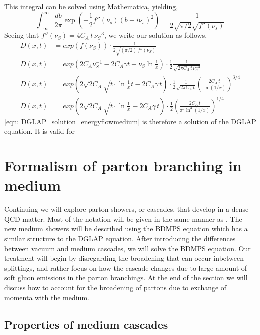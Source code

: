 \documentclass[main.tex]{subfiles}
\begin{document}
This integral can be solved using Mathematica, yielding,
\begin{equation}
    \int_{-\infty}^{\infty}\frac{db}{2\pi} \exp \left(-\frac{1}{2} f''(\nu_s)(b+i\nu_s)^2 \right) = \frac{1}{2\sqrt{\pi/2}\sqrt{f''(\nu_s)}}
\end{equation}
Seeing that \(f''(\nu_S) = 4C_A\,t\, \nu_S^{-3}\), we write our solution as follows,
\begin{align}\label{eqn: DGLAP_solution_energyflowmedium}
    D(x,t) &= exp \left(f(\nu_S) \right) \cdot \frac{1}{2\sqrt{(\pi/2) \, f''(\nu_S)}}  \nonumber\\
    D(x,t) &= exp \left(2C_A \nu_S^{-1}-2C_A\gamma t + \nu_S \ln \frac{1}{x} \right) \cdot \frac{1}{2} \frac{1}{\sqrt{2\pi C_A\,t\, \nu_S^{-3}}}  \nonumber\\
    D(x,t) &= exp \left(2\sqrt{2C_A} \sqrt{t\cdot \ln \frac{1}{x}}t - 2C_A\gamma \,t \right) \cdot \frac{1}{2} \frac{1}{\sqrt{2 \pi C_A\,t} } \left(\frac{2C_A\,t}{\ln(1/x)}\right)^{3/4} \nonumber\\
    D(x,t) &= exp \left(2\sqrt{2C_A} \sqrt{t\cdot \ln \frac{1}{x}} - 2C_A\gamma \,t \right) \cdot \frac{1}{2} \left(\frac{2C_A\,t}{\pi^2 \ln^3(1/x)}\right)^{1/4}
\end{align}
\autoref{eqn: DGLAP_solution_energyflowmedium} is therefore a solution of the DGLAP equation. It is valid for \elab 


\newpage
\section{Formalism of parton branching in medium}
Continuing we will explore parton showers, or cascades, that develop in a dense QCD matter. Most of the notation will be given in the same manner as \cite{Energy_flow_medium_cascade_2016}. The new medium showers will be described using the BDMPS equation which has a similar structure to the DGLAP equation. After introducing the differences between vacuum and medium cascades, we will solve the BDMPS equation. Our treatment will begin by disregarding the broadening that can occur inbetween splittings, and rather focus on how the cascade changes due to large amount of soft gluon emissions in the parton branchings. At the end of the section we will discuss how to account for the broadening of partons due to exchange of momenta with the medium.

\subsection{Properties of medium cascades}\label{sec: BDMPS_properties}
\end{document}

